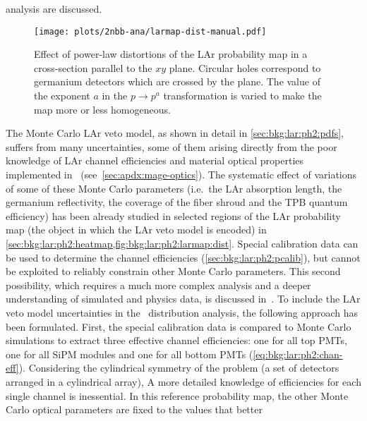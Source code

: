 analysis are discussed.

\begin{description}[wide]

    \begin{figure}
      \centering
      \texttt{[image: plots/2nbb-ana/larmap-dist-manual.pdf]}
      \caption{%
        Effect of power-law distortions of the LAr probability map in a cross-section
        parallel to the $xy$ plane. Circular holes correspond to germanium detectors which
        are crossed by the plane. The value of the exponent $a$ in the $p \rightarrow
        p^a$ transformation is varied to make the map more or less homogeneous.
      }\label{fig:2nbb-ana:larmap-dist-showoff}
    \end{figure}

  \item[LAr veto model] The Monte Carlo LAr veto model, as shown in detail in
    \cref{sec:bkg:lar:ph2:pdfs}, suffers from many uncertainties, some of them arising
    directly from the poor knowledge of LAr channel efficiencies and material optical
    properties implemented in \mage\ (see~\cref{sec:apdx:mage-optics}). The systematic
    effect of variations of some of these Monte Carlo parameters (i.e.~the LAr absorption
    length, the germanium reflectivity, the coverage of the fiber shroud and the TPB
    quantum efficiency) has been already studied in selected regions of the LAr
    probability map (the object in which the LAr veto model is encoded) in
    \cref{sec:bkg:lar:ph2:heatmap,fig:bkg:lar:ph2:larmap:dist}. Special calibration data
    can be used to determine the channel efficiencies (\cref{sec:bkg:lar:ph2:pcalib}), but
    cannot be exploited to reliably constrain other Monte Carlo parameters. This second
    possibility, which requires a much more complex analysis and a deeper understanding of
    simulated and physics data, is discussed in~\cite{Wiesinger2021}.
    \newpar
    To include the LAr veto model uncertainties in the \nnbb\ distribution analysis, the
    following approach has been formulated. First, the special calibration data is
    compared to Monte Carlo simulations to extract three effective channel efficiencies:
    one for all top PMTs, one for all SiPM modules and one for all bottom PMTs
    (\cref{eq:bkg:lar:ph2:chan-eff}). Considering the cylindrical symmetry of the problem
    (a set of detectors arranged in a cylindrical array), A more detailed knowledge of
    efficiencies for each single channel is inessential. In this reference probability
    map, the other Monte Carlo optical parameters are fixed to the values that better

\end{description}
